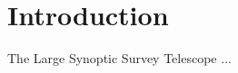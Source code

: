 \section{Introduction}

The Large Synoptic Survey Telescope \citep[LSST;][]{2008arXiv0805.2366I}...
